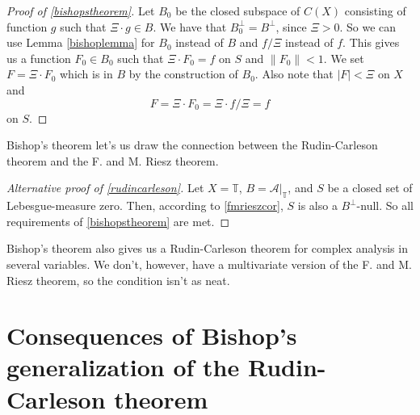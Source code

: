 \documentclass[a4paper,12pt,twoside,BCOR=10mm]{scrbook}
\theoremstyle{definition}
\theoremstyle{definition}
\theoremstyle{definition}
\begin{document}
\begin{proof}[Proof of \ref{bishopstheorem}]
Let $B_0$ be the closed subspace of $C(X)$ consisting of function $g$ such that $\Xi \cdot g \in B$.
We have that $B_0^{\bot} = B^{\bot}$, since $\Xi > 0$.
So we can use Lemma \ref{bishoplemma} for $B_0$ instead of $B$ and $f/\Xi$ instead of $f$.
This gives us a function $F_0 \in B_0$ such that $\Xi \cdot F_0 = f$ on $S$ and $\|F_0\| < 1$.
We set $F = \Xi \cdot F_0$ which is in $B$ by the construction of $B_0$.
Also note that $|F| < \Xi$ on $X$ and 
\[
	F = \Xi \cdot F_0 = \Xi \cdot f/\Xi = f
\]
on $S$.
\end{proof}
Bishop's theorem let's us draw the connection between the Rudin-Carleson theorem and the F. and M. Riesz theorem.
\begin{proof}[Alternative proof of \ref{rudincarleson}]
Let
	$X = \mathbb{T}$,
	$B = \mathcal{A}|_{\mathbb{T}}$,
	and $S$ be a closed set of Lebesgue-measure zero. 
Then, according to \ref{fmrieszcor}, $S$ is also a $B^{\bot}$-null.
So all requirements of \ref{bishopstheorem} are met.
\end{proof}
Bishop's theorem also gives us a Rudin-Carleson theorem for complex analysis in several variables.
We don't, however, have a multivariate version of the F. and M. Riesz theorem, so the condition isn't as neat.

\chapter{Consequences of Bishop's generalization of the Rudin-Carleson theorem}
\end{document}
